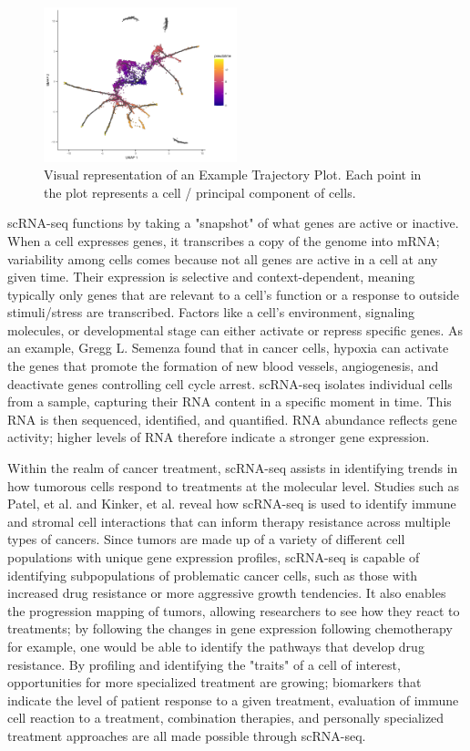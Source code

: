 \documentclass{article}
\begin{document}
\begin{figure}[h]
\centering
\includegraphics[width=0.5\textwidth]{./images/umap.png}
\caption{Visual representation of an Example Trajectory Plot. Each point in the plot represents a cell / principal component of cells.}
\end{figure}

scRNA-seq functions by taking a "snapshot" of what genes are active or inactive. When a cell expresses genes, it transcribes a copy of the genome into mRNA; variability among cells comes because not all genes are active in a cell at any given time. Their expression is selective and context-dependent, meaning typically only genes that are relevant to a cell's function or a response to outside stimuli/stress are transcribed. Factors like a cell's environment, signaling molecules, or developmental stage can either activate or repress specific genes. As an example, Gregg L. Semenza found that in cancer cells, hypoxia can activate the genes that promote the formation of new blood vessels, angiogenesis, and deactivate genes controlling cell cycle arrest. scRNA-seq isolates individual cells from a sample, capturing their RNA content in a specific moment in time. This RNA is then sequenced, identified, and quantified. RNA abundance reflects gene activity; higher levels of RNA therefore indicate a stronger gene expression.

Within the realm of cancer treatment, scRNA-seq assists in identifying trends in how tumorous cells respond to treatments at the molecular level. Studies such as Patel, et al. and Kinker, et al. reveal how scRNA-seq is used to identify immune and stromal cell interactions that can inform therapy resistance across multiple types of cancers. Since tumors are made up of a variety of different cell populations with unique gene expression profiles, scRNA-seq is capable of identifying subpopulations of problematic cancer cells, such as those with increased drug resistance or more aggressive growth tendencies. It also enables the progression mapping of tumors, allowing researchers to see how they react to treatments; by following the changes in gene expression following chemotherapy for example, one would be able to identify the pathways that develop drug resistance. By profiling and identifying the "traits" of a cell of interest, opportunities for more specialized treatment are growing; biomarkers that indicate the level of patient response to a given treatment, evaluation of immune cell reaction to a treatment, combination therapies, and personally specialized treatment approaches are all made possible through scRNA-seq.
\end{document}
